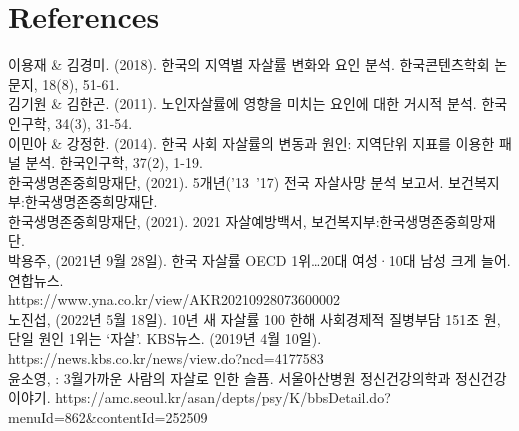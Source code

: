\documentclass[a4paper, 11pt]{oblivoir}
\begin{document}
    \section{References}
    이용재 \& 김경미. (2018). 한국의 지역별 자살률 변화와 요인 분석. 한국콘텐츠학회 논문지, 18(8), 51-61.\\
    김기원 \& 김한곤. (2011). 노인자살률에 영향을 미치는 요인에 대한 거시적 분석. 한국인구학, 34(3), 31-54.\\
    이민아 \& 강정한. (2014). 한국 사회 자살률의 변동과 원인: 지역단위 지표를 이용한 패널 분석. 한국인구학, 37(2), 1-19.\\
    한국생명존중희망재단, (2021). 5개년(’13~’17) 전국 자살사망 분석 보고서. 보건복지부:한국생명존중희망재단.\\
    한국생명존중희망재단, (2021). 2021 자살예방백서, 보건복지부:한국생명존중희망재단.\\
    박용주, (2021년 9월 28일). 한국 자살률 OECD 1위…20대 여성·10대 남성 크게 늘어. 연합뉴스.\\
    https://www.yna.co.kr/view/AKR20210928073600002\\
    노진섭, (2022년 5월 18일). 10년 새 자살률 100%
    한해 사회경제적 질병부담 151조 원, 단일 원인 1위는 ‘자살’. KBS뉴스. (2019년 4월 10일). https://news.kbs.co.kr/news/view.do?ncd=4177583\\
    윤소영,  : 3월\rbrack 가까운 사람의 자살로 인한 슬픔. 서울아산병원 정신건강의학과 정신건강이야기. https://amc.seoul.kr/asan/depts/psy/K/bbsDetail.do?menuId=862\&contentId=252509
\end{document}
